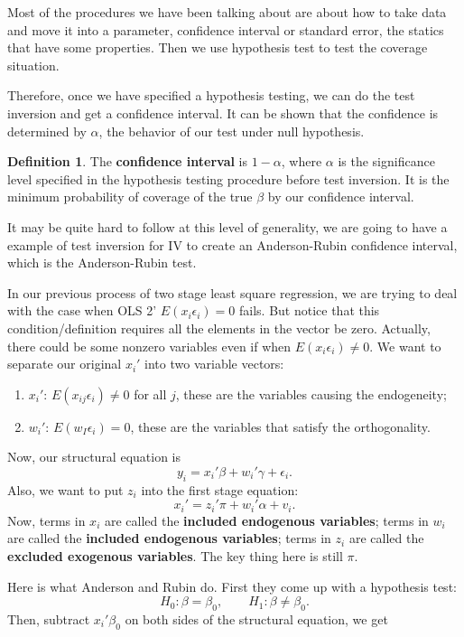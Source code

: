 \documentclass[11pt,a4paper]{amsart}
\theoremstyle{plain}
\theoremstyle{definition}
\newtheorem{definition}{Definition}
\begin{document}
	Most of the procedures we have been talking about are about how to take data and move it into a parameter, confidence interval or standard error, the statics that have some properties. Then we use hypothesis test to test the coverage situation. \par 
	Therefore, once we have specified a hypothesis testing, we can do the test inversion and get a confidence interval. It can be shown that the confidence is determined by $\alpha$, the behavior of our test under null hypothesis. 
	\begin{definition}
		The \textbf{confidence interval} is $1-\alpha$, where $\alpha$ is the significance level specified in the hypothesis testing procedure before test inversion. It is the minimum probability of coverage of the true $\beta$ by our confidence interval.
	\end{definition}
	It may be quite hard to follow at this level of generality, we are going to have a example of test inversion for IV to create an Anderson-Rubin confidence interval, which is the Anderson-Rubin test. \par 
	In our previous process of two stage least square regression, we are trying to deal with the case when OLS 2' $E(x_{i}\epsilon_{i}) = 0$ fails. But notice that this condition/definition requires all the elements in the vector be zero. Actually, there could be some nonzero variables even if when $E(x_{i}\epsilon_{i}) \ne 0$. We want to separate our original $x_{i}'$ into two variable vectors:
	\begin{enumerate}
		\item $x_{i}'$: $E(x_{ij}\epsilon_{i}) \ne 0$ for all $j$, these are the variables causing the endogeneity;
		\item $w_{i}'$: $E(w_{I}\epsilon_{i}) = 0$, these are the variables that satisfy the orthogonality.
	\end{enumerate}
		Now, our structural equation is 
	\[	y_{i} = x_{i}' \beta + w_{i}' \gamma + \epsilon_{i}.	\] 
	Also, we want to put $z_{i}$ into the first stage equation:
	\[	x_{i}' = z_{i}'\pi + w_{i}'\alpha + v_{i}. 	\]
	Now, terms in $x_{i}$ are called the \textbf{included endogenous variables}; terms in $w_{i}$ are called the \textbf{included endogenous variables}; terms in $z_{i}$ are called the \textbf{excluded exogenous variables}. The key thing here is still $\pi$. \par 
	Here is what Anderson and Rubin do. First they come up with a hypothesis test:
	\[	H_{0} : \beta = \beta_{0}, \qquad H_{1} : \beta \ne \beta_{0}.	\]
	Then, subtract $x_{i}'\beta_{0}$ on both sides of the structural equation, we get 
\end{document}
